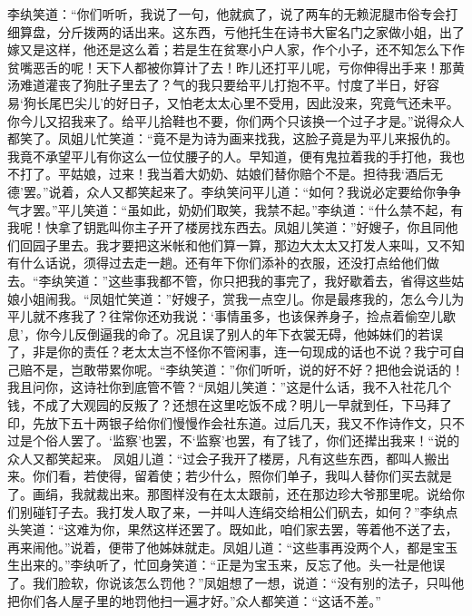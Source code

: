 \documentclass[12pt,oneside]{book}
\begin{document}
李纨笑道：“你们听听，我说了一句，他就疯了，说了两车的无赖泥腿市俗专会打细算盘，分斤拨两的话出来。这东西，亏他托生在诗书大宦名门之家做小姐，出了嫁又是这样，他还是这么着；若是生在贫寒小户人家，作个小子，还不知怎么下作贫嘴恶舌的呢！天下人都被你算计了去！昨儿还打平儿呢，亏你伸得出手来！那黄汤难道灌丧了狗肚子里去了？气的我只要给平儿打抱不平。忖度了半日，好容易‘狗长尾巴尖儿’的好日子，又怕老太太心里不受用，因此没来，究竟气还未平。你今儿又招我来了。给平儿拾鞋也不要，你们两个只该换一个过子才是。”说得众人都笑了。凤姐儿忙笑道：“竟不是为诗为画来找我，这脸子竟是为平儿来报仇的。我竟不承望平儿有你这么一位仗腰子的人。早知道，便有鬼拉着我的手打他，我也不打了。平姑娘，过来！我当着大奶奶、姑娘们替你赔个不是。担待我‘酒后无德’罢。”说着，众人又都笑起来了。李纨笑问平儿道：“如何？我说必定要给你争争气才罢。”平儿笑道：“虽如此，奶奶们取笑，我禁不起。”李纨道：“什么禁不起，有我呢！快拿了钥匙叫你主子开了楼房找东西去。凤姐儿笑道：”好嫂子，你且同他们回园子里去。我才要把这米帐和他们算一算，那边大太太又打发人来叫，又不知有什么话说，须得过去走一趟。还有年下你们添补的衣服，还没打点给他们做去。“李纨笑道：”这些事我都不管，你只把我的事完了，我好歇着去，省得这些姑娘小姐闹我。“凤姐忙笑道：”好嫂子，赏我一点空儿。你是最疼我的，怎么今儿为平儿就不疼我了？往常你还劝我说：‘事情虽多，也该保养身子，捡点着偷空儿歇息’，你今儿反倒逼我的命了。况且误了别人的年下衣裳无碍，他姊妹们的若误了，非是你的责任？老太太岂不怪你不管闲事，连一句现成的话也不说？我宁可自己赔不是，岂敢带累你呢。“李纨笑道：”你们听听，说的好不好？把他会说话的！我且问你，这诗社你到底管不管？“凤姐儿笑道：”这是什么话，我不入社花几个钱，不成了大观园的反叛了？还想在这里吃饭不成？明儿一早就到任，下马拜了印，先放下五十两银子给你们慢慢作会社东道。过后几天，我又不作诗作文，只不过是个俗人罢了。‘监察’也罢，不‘监察’也罢，有了钱了，你们还撵出我来！“说的众人又都笑起来。
凤姐儿道：“过会子我开了楼房，凡有这些东西，都叫人搬出来。你们看，若使得，留着使；若少什么，照你们单子，我叫人替你们买去就是了。画绢，我就裁出来。那图样没有在太太跟前，还在那边珍大爷那里呢。说给你们别碰钉子去。我打发人取了来，一并叫人连绢交给相公们矾去，如何？”李纨点头笑道：“这难为你，果然这样还罢了。既如此，咱们家去罢，等着他不送了去，再来闹他。”说着，便带了他姊妹就走。凤姐儿道：“这些事再没两个人，都是宝玉生出来的。”李纨听了，忙回身笑道：“正是为宝玉来，反忘了他。头一社是他误了。我们脸软，你说该怎么罚他？”凤姐想了一想，说道：“没有别的法子，只叫他把你们各人屋子里的地罚他扫一遍才好。”众人都笑道：“这话不差。”
\end{document}
